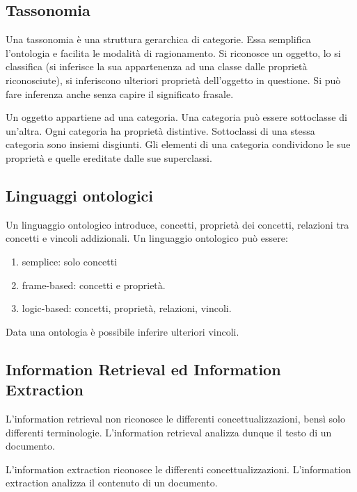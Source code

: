 \subsection{Tassonomia}
Una tassonomia è una struttura gerarchica di categorie. Essa semplifica l'ontologia e facilita le modalità di ragionamento.
Si riconosce un oggetto, lo si classifica (si inferisce la sua appartenenza ad una classe dalle proprietà riconosciute), si inferiscono ulteriori proprietà dell'oggetto in questione.
Si può fare inferenza anche senza capire il significato frasale.

Un oggetto appartiene ad una categoria. Una categoria può essere sottoclasse di un'altra. Ogni categoria ha proprietà distintive. Sottoclassi di una stessa categoria sono insiemi disgiunti. Gli elementi di una categoria condividono le sue proprietà e quelle ereditate dalle sue superclassi.


\subsection{Linguaggi ontologici}
Un linguaggio ontologico introduce, concetti, proprietà dei concetti, relazioni tra concetti e vincoli addizionali.
Un linguaggio ontologico può essere:

\begin{enumerate}
	
	\item semplice: solo concetti
	
	\item frame-based: concetti e proprietà.
	
	\item logic-based: concetti, proprietà, relazioni, vincoli.
	
\end{enumerate}

Data una ontologia è possibile inferire ulteriori vincoli. 


\subsection{Information Retrieval ed Information Extraction}
L'information retrieval non riconosce le differenti concettualizzazioni, bensì solo differenti terminologie. L'information retrieval analizza dunque il testo di un documento.

L'information extraction riconosce le differenti concettualizzazioni. L'information extraction analizza il contenuto di un documento.


